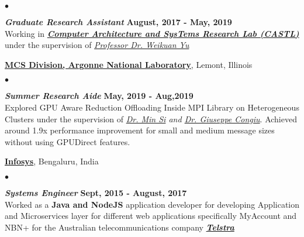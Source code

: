 \documentclass[margin,line]{res}
\newenvironment{list2}{
  \begin{list}{$\bullet$}{%
      \setlength{\itemsep}{0in}
      \setlength{\parsep}{0in} \setlength{\parskip}{0in}
      \setlength{\topsep}{0in} \setlength{\partopsep}{0in} 
      \setlength{\leftmargin}{0.2in}}}{\end{list}}
\begin{document}
\begin{resume}
\begin{list2}
\item \textbf{{\em Graduate Research Assistant}} \hfill {\bf August, 2017 - 
May, 2019}\\
Working in \textbf{\textit{\href{http://castl.cs.fsu.edu/doku.php/}{Computer 
Architecture and SysTems Research Lab (CASTL)}}} under the supervision of 
\textit{\href{https://www.cs.fsu.edu/~yuw/}{Professor Dr. Weikuan Yu}}
\end{list2}

\vspace{-.4cm}

{\bf \href{https://www.anl.gov/mcs}{MCS Division, Argonne National Laboratory}}, Lemont, Illinois
\begin{list2}
	\item \textbf{{\em Summer Research Aide}} \hfill {\bf May, 2019 - Aug,2019}\\
	Explored GPU Aware Reduction Offloading Inside MPI Library on Heterogeneous Clusters under the supervision of
	\textit{\href{https://www.mcs.anl.gov/~minsi/}{Dr. Min Si} and \href{https://www.mcs.anl.gov/~gcongiu/}{Dr. Giuseppe Congiu}}. Achieved around 1.9x performance improvement for small and medium message sizes without using GPUDirect features.
\end{list2}

\vspace{-.4cm}

{\bf \href{https://www.infosys.com/}{Infosys}}, Bengaluru, India
\begin{list2}
\item \textbf{{\em Systems Engineer}} \hfill {\bf Sept, 2015 - August, 2017}\\
Worked as a {\bf Java and NodeJS} application developer for developing 
Application and Microservices layer for different web applications specifically 
MyAccount and NBN+ for the Australian telecommunications company
\textbf{\textit{\href{https://www.telstra.com.au/Telstra/}{Telstra}}}
\end{list2}
\vspace*{-.18in}

\end{resume}
\end{document}
